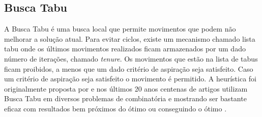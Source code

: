 \documentclass[12pt,a4paper]{article}
\begin{document}










\subsection{Busca Tabu}
\label{sec:busca_tabu}

    A Busca Tabu é uma busca local que permite movimentos que podem não melhorar a solução atual. Para evitar ciclos, existe um mecanismo chamado lista tabu onde os últimos movimentos realizados
    ficam armazenados por um dado número de iterações, chamado \textit{tenure}. Os movimentos que estão na lista de tabus ficam proibidos, a menos que um dado critério de aspiração seja
    satisfeito. Caso um critério de aspiração seja satisfeito o movimento é permitido. A heurística foi originalmente proposta por \citeauthor{glover1986future} \cite{glover1986future} e nos
    últimos 20 anos centenas de artigos utilizam Busca Tabu em diversos problemas de combinatória e mostrando ser bastante eficaz com resultados bem próximos do ótimo ou conseguindo o ótimo
    \cite{gendreau2010handbook}.
\end{document}
